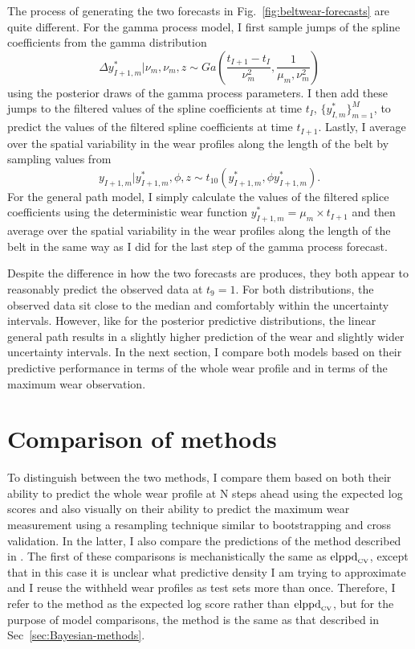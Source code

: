The process of generating the two forecasts in Fig.~\ref{fig:beltwear-forecasts} are quite different. For the gamma process model, I first sample jumps of the spline coefficients from the gamma distribution
\begin{equation}
  \Delta y^*_{I + 1, m}|\nu_m, \nu_m, z \sim Ga\left(\frac{t_{I + 1} - t_{I}}{\nu_m^2}, \frac{1}{\mu_m, \nu_m^2}\right)
\end{equation}
using the posterior draws of the gamma process parameters. I then add these jumps to the filtered values of the spline coefficients at time $t_I$, $\{y^*_{I, m}\}^M_{m = 1}$, to predict the values of the filtered spline coefficients at time $t_{I + 1}$. Lastly, I average over the spatial variability in the wear profiles along the length of the belt by sampling values from
\begin{equation}
  y_{I + 1, m}|y^*_{I + 1, m}, \phi, z \sim t_{10}(y^*_{I + 1, m}, \phi y^*_{I + 1, m}).
\end{equation}
For the general path model, I simply calculate the values of the filtered splice coefficients using the deterministic wear function $y^*_{I + 1, m} = \mu_m \times t_{I+1}$ and then average over the spatial variability in the wear profiles along the length of the belt in the same way as I did for the last step of the gamma process forecast.

Despite the difference in how the two forecasts are produces, they both appear to reasonably predict the observed data at $t_9 = 1$. For both distributions, the observed data sit close to the median and comfortably within the uncertainty intervals. However, like for the posterior predictive distributions, the linear general path results in a slightly higher prediction of the wear and slightly wider uncertainty intervals. In the next section, I compare both models based on their predictive performance in terms of the whole wear profile and in terms of the maximum wear observation.

\section{Comparison of methods} \label{sec:belt-wear-comparison}

To distinguish between the two methods, I compare them based on both their ability to predict the whole wear profile at N steps ahead using the expected log scores and also visually on their ability to predict the maximum wear measurement using a resampling technique similar to bootstrapping and cross validation. In the latter, I also compare the predictions of the method described in \citet{webb_2020}. The first of these comparisons is mechanistically the same as $\hbox{elppd}_{\text{\tiny{CV}}}$, except that in this case it is unclear what predictive density I am trying to approximate and I reuse the withheld wear profiles as test sets more than once. Therefore, I refer to the method as the expected log score rather than $\hbox{elppd}_{\text{\tiny{CV}}}$, but for the purpose of model comparisons, the method is the same as that described in Sec~\ref{sec:Bayesian-methods}.

